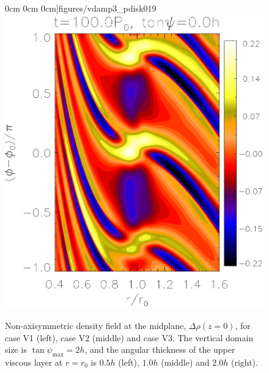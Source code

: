 \begin{figure}
     0cm 0cm
     0cm]{figures/vdamp3_pdisk019}\includegraphics[scale=.27,clip=true,clip=true,trim=2.3cm
     0cm 0cm
     0cm]{figures/vdamp0_nu4_pdisk019}%
    \caption{Non-axisymmetric density field at the midplane,
      $\Delta\rho(z=0)$, for case V1 (left), case V2 (middle) and case
      V3. The vertical domain size is $\tan{\psi_\mathrm{max}} = 2h$,
      and the angular thickness of the upper viscous layer at $r=r_0$
      is $0.5h$ (left), $1.0h$ (middle) and $2.0h$ (right).   
      \label{vdamp2}}
\end{figure}


